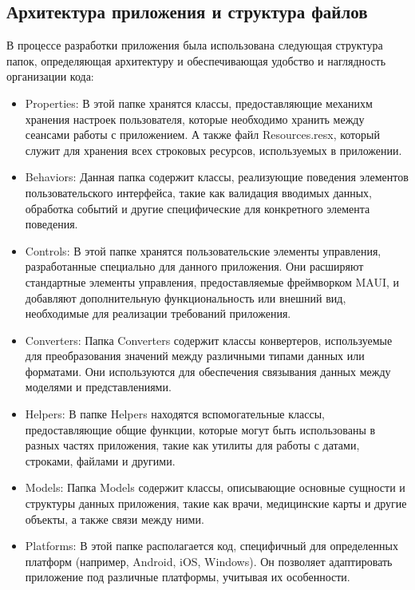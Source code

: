 \subsection{Архитектура приложения и структура файлов}
В процессе разработки приложения была использована следующая структура папок, определяющая архитектуру и обеспечивающая удобство и наглядность организации кода:
\begin{itemize}
    \item Properties: В этой папке хранятся классы, предоставляющие механихм хранения настроек пользователя, которые необходимо хранить между сеансами работы с приложением. А также файл Resources.resx, который служит для хранения всех строковых ресурсов, используемых в приложении.

    \item Behaviors: Данная папка содержит классы, реализующие поведения элементов пользовательского интерфейса, такие как валидация вводимых данных, обработка событий и другие специфические для конкретного элемента поведения.

    \item Controls: В этой папке хранятся пользовательские элементы управления, разработанные специально для данного приложения. Они расширяют стандартные элементы управления, предоставляемые фреймворком MAUI, и добавляют дополнительную функциональность или внешний вид, необходимые для реализации требований приложения.

    \item Converters: Папка Converters содержит классы конвертеров, используемые для преобразования значений между различными типами данных или форматами. Они используются для обеспечения связывания данных между моделями и представлениями.

    \item Helpers: В папке Helpers находятся вспомогательные классы, предоставляющие общие функции, которые могут быть использованы в разных частях приложения, такие как утилиты для работы с датами, строками, файлами и другими.

    \item Models: Папка Models содержит классы, описывающие основные сущности и структуры данных приложения, такие как врачи, медицинские карты и другие объекты, а также связи между ними.

    \item Platforms: В этой папке располагается код, специфичный для определенных платформ (например, Android, iOS, Windows). Он позволяет адаптировать приложение под различные платформы, учитывая их особенности.


\end{itemize}
